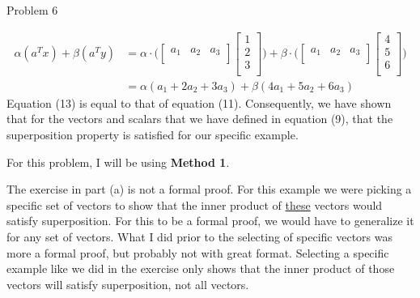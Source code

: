 \begin{problem}{Problem 6}
\begin{highlight}
        \normalsize
        \begin{align}
            \alpha(a^{T}x) + \beta(a^{T}y) & = \alpha \cdot
            \Bigg(
            \begin{bmatrix}
                a_{1} & a_{2} & a_{3} \\
            \end{bmatrix}
            \begin{bmatrix}
                1 \\
                2 \\
                3 \\
            \end{bmatrix}
            \Bigg) + \beta \cdot
            \Bigg(
            \begin{bmatrix}
                a_{1} & a_{2} & a_{3} \\
            \end{bmatrix}
            \begin{bmatrix}
                4 \\
                5 \\
                6 \\
            \end{bmatrix}
            \Bigg) \\
            & = \alpha(a_{1} + 2a_{2} + 3a_{3}) + \beta(4a_{1} + 5a_{2} + 6a_{3})
        \end{align}
        Equation (13) is equal to that of equation (11). Consequently, we have shown that for the vectors and scalars that we have defined in equation (9), that the superposition property is satisfied 
        for our specific example. 
    \end{highlight}

    \begin{highlight}
        For this problem, I will be using \textbf{Method 1}. \vspace*{1em}

        The exercise in part (a) is not a formal proof. For this example we were picking a specific set of vectors to show that the inner product of \underline{these} vectors would satisfy superposition.
        For this to be a formal proof, we would have to generalize it for any set of vectors. What I did prior to the selecting of specific vectors was more a formal proof, but probably not with great 
        format. Selecting a specific example like we did in the exercise only shows that the inner product of those vectors will satisfy superposition, not all vectors.
    \end{highlight}


\end{problem}
